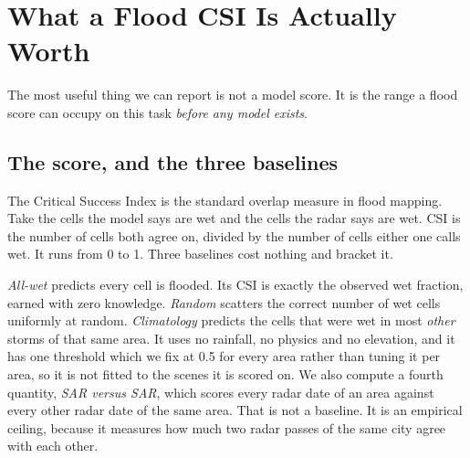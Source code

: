 \section{What a Flood CSI Is Actually Worth}
\label{sec:worth}

The most useful thing we can report is not a model score. It is the range a flood score can occupy
on this task \emph{before any model exists}.

\subsection{The score, and the three baselines}
The Critical Success Index is the standard overlap measure in flood mapping. Take the cells the
model says are wet and the cells the radar says are wet. CSI is the number of cells both agree on,
divided by the number of cells either one calls wet. It runs from 0 to 1. Three baselines cost
nothing and bracket it.

\emph{All-wet} predicts every cell is flooded. Its CSI is exactly the observed wet fraction, earned
with zero knowledge. \emph{Random} scatters the correct number of wet cells uniformly at random.
\emph{Climatology} predicts the cells that were wet in most \emph{other} storms of that same area.
It uses no rainfall, no physics and no elevation, and it has one threshold which we fix at 0.5 for
every area rather than tuning it per area, so it is not fitted to the scenes it is scored on. We
also compute a fourth quantity, \emph{SAR versus SAR}, which scores every radar date of an area
against every other radar date of the same area. That is not a baseline. It is an empirical ceiling,
because it measures how much two radar passes of the same city agree with each other.

